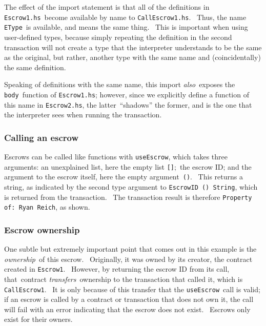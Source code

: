 \documentclass[11pt]{article}
\begin{document}

\vspace{11pt}

The effect of the import statement is that all of the definitions in \texttt{Escrow1.hs} become available by name to \texttt{CallEscrow1.hs}.  Thus, the name \texttt{EType} is available, and means the same thing.  This is important when using user-defined types, because simply repeating the definition in the second transaction will not create a type that the interpreter understands to be the same as the original, but rather, another type with the same name and (coincidentally) the same definition.


\vspace{11pt}

Speaking of definitions with the same name, this import \textit{also} exposes the \texttt{body} function of \texttt{Escrow1.hs}; however, since we explicitly define a function of this name in \texttt{Escrow2.hs}, the latter “shadows” the former, and is the one that the interpreter sees when running the transaction.

\subsubsection{Calling an escrow}
\vspace{5.5pt}

Escrows can be called like functions with \texttt{useEscrow}, which takes three arguments: an unexplained list, here the empty list \texttt{{[}{]}}; the escrow ID; and the argument to the escrow itself, here the empty argument \texttt{()}.  This returns a string, as indicated by the second type argument to \texttt{EscrowID () String}, which is returned from the transaction.  The transaction result is therefore \texttt{Property of: Ryan Reich}, as shown.

\subsubsection{Escrow ownership}
\vspace{5.5pt}

One subtle but extremely important point that comes out in this example is the \textit{ownership} of this escrow.  Originally, it was owned by its creator, the contract created in \texttt{Escrow1}.  However, by returning the escrow ID from its call, that contract \textit{transfers} ownership to the transaction that called it, which is \texttt{CallEscrow1}.  It is only because of this transfer that the \texttt{useEscrow} call is valid; if an escrow is called by a contract or transaction that does not own it, the call will fail with an error indicating that the escrow does not exist.  Escrows only exist for their owners.
\end{document}
